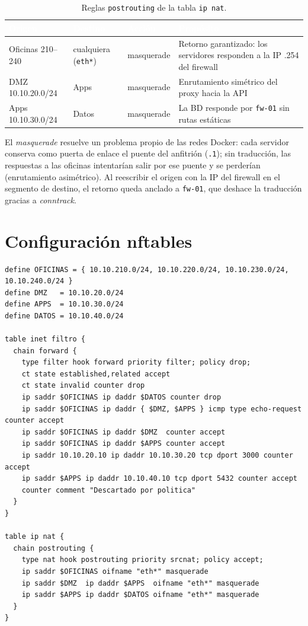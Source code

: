 \documentclass[11pt,a4paper,oneside]{report}
\newcommand{\cod}[1]{\texttt{\small #1}}
\begin{document}
\begin{table}[htbp]
\centering\small
\caption{Reglas \cod{postrouting} de la tabla \cod{ip nat}.}
\label{tab:fw-nat}
\begin{tabularx}{\textwidth}{@{}L{3.2cm} L{2.6cm} l X@{}}
\toprule
{}
\textcolor{white}{\textbf{Origen}} & \textcolor{white}{\textbf{Destino}} & \textcolor{white}{\textbf{Acción}} &
\textcolor{white}{\textbf{Propósito}} \\
\midrule
Oficinas 210--240 & cualquiera (\cod{eth*}) & masquerade & Retorno garantizado: los servidores responden a la IP .254 del firewall \\
DMZ 10.10.20.0/24 & Apps & masquerade & Enrutamiento simétrico del proxy hacia la API \\
Apps 10.10.30.0/24 & Datos & masquerade & La BD responde por \cod{fw-01} sin rutas estáticas \\
\bottomrule
\end{tabularx}
\end{table}

El \emph{masquerade} resuelve un problema propio de las redes Docker: cada servidor conserva
como puerta de enlace el puente del anfitrión (\cod{.1}); sin traducción, las respuestas
a las oficinas intentarían salir por ese puente y se perderían (enrutamiento asimétrico).
Al reescribir el origen con la IP del firewall en el segmento de destino, el retorno queda
anclado a \cod{fw-01}, que deshace la traducción gracias a \emph{conntrack}.

\section{Configuración nftables}

\begin{lstlisting}[language=nft,caption={Extracto de \cod{/etc/nftables.conf} en \cod{fw-01}.},label=lst:nft]
define OFICINAS = { 10.10.210.0/24, 10.10.220.0/24, 10.10.230.0/24, 10.10.240.0/24 }
define DMZ   = 10.10.20.0/24
define APPS  = 10.10.30.0/24
define DATOS = 10.10.40.0/24

table inet filtro {
  chain forward {
    type filter hook forward priority filter; policy drop;
    ct state established,related accept
    ct state invalid counter drop
    ip saddr $OFICINAS ip daddr $DATOS counter drop
    ip saddr $OFICINAS ip daddr { $DMZ, $APPS } icmp type echo-request counter accept
    ip saddr $OFICINAS ip daddr $DMZ  counter accept
    ip saddr $OFICINAS ip daddr $APPS counter accept
    ip saddr 10.10.20.10 ip daddr 10.10.30.20 tcp dport 3000 counter accept
    ip saddr $APPS ip daddr 10.10.40.10 tcp dport 5432 counter accept
    counter comment "Descartado por politica"
  }
}

table ip nat {
  chain postrouting {
    type nat hook postrouting priority srcnat; policy accept;
    ip saddr $OFICINAS oifname "eth*" masquerade
    ip saddr $DMZ  ip daddr $APPS  oifname "eth*" masquerade
    ip saddr $APPS ip daddr $DATOS oifname "eth*" masquerade
  }
}
\end{lstlisting}
\end{document}
